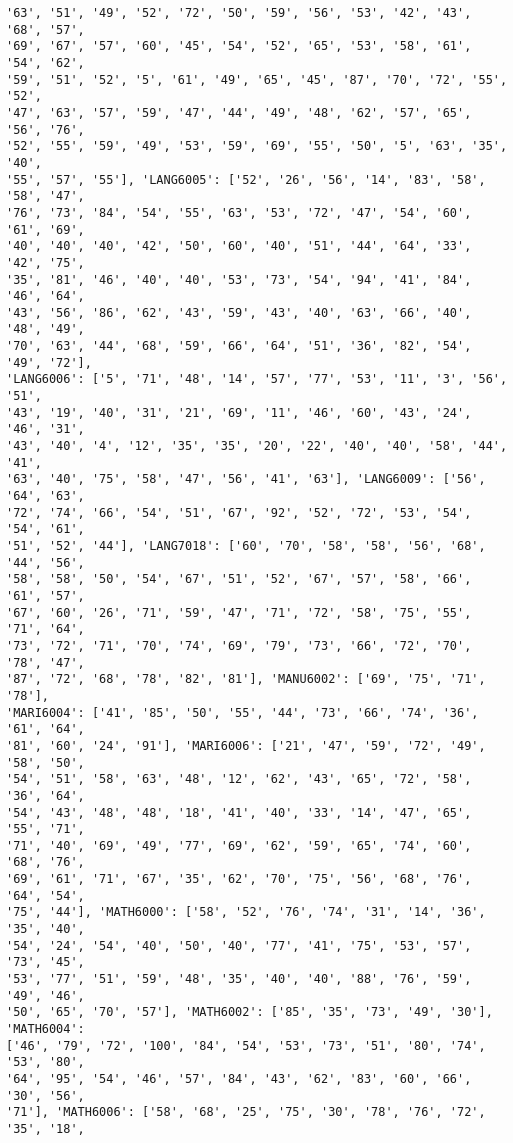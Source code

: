 \documentclass[11pt]{article}
\begin{document}
\begin{Verbatim}[commandchars=\\\{\}]
'63', '51', '49', '52', '72', '50', '59', '56', '53', '42', '43', '68', '57',
'69', '67', '57', '60', '45', '54', '52', '65', '53', '58', '61', '54', '62',
'59', '51', '52', '5', '61', '49', '65', '45', '87', '70', '72', '55', '52',
'47', '63', '57', '59', '47', '44', '49', '48', '62', '57', '65', '56', '76',
'52', '55', '59', '49', '53', '59', '69', '55', '50', '5', '63', '35', '40',
'55', '57', '55'], 'LANG6005': ['52', '26', '56', '14', '83', '58', '58', '47',
'76', '73', '84', '54', '55', '63', '53', '72', '47', '54', '60', '61', '69',
'40', '40', '40', '42', '50', '60', '40', '51', '44', '64', '33', '42', '75',
'35', '81', '46', '40', '40', '53', '73', '54', '94', '41', '84', '46', '64',
'43', '56', '86', '62', '43', '59', '43', '40', '63', '66', '40', '48', '49',
'70', '63', '44', '68', '59', '66', '64', '51', '36', '82', '54', '49', '72'],
'LANG6006': ['5', '71', '48', '14', '57', '77', '53', '11', '3', '56', '51',
'43', '19', '40', '31', '21', '69', '11', '46', '60', '43', '24', '46', '31',
'43', '40', '4', '12', '35', '35', '20', '22', '40', '40', '58', '44', '41',
'63', '40', '75', '58', '47', '56', '41', '63'], 'LANG6009': ['56', '64', '63',
'72', '74', '66', '54', '51', '67', '92', '52', '72', '53', '54', '54', '61',
'51', '52', '44'], 'LANG7018': ['60', '70', '58', '58', '56', '68', '44', '56',
'58', '58', '50', '54', '67', '51', '52', '67', '57', '58', '66', '61', '57',
'67', '60', '26', '71', '59', '47', '71', '72', '58', '75', '55', '71', '64',
'73', '72', '71', '70', '74', '69', '79', '73', '66', '72', '70', '78', '47',
'87', '72', '68', '78', '82', '81'], 'MANU6002': ['69', '75', '71', '78'],
'MARI6004': ['41', '85', '50', '55', '44', '73', '66', '74', '36', '61', '64',
'81', '60', '24', '91'], 'MARI6006': ['21', '47', '59', '72', '49', '58', '50',
'54', '51', '58', '63', '48', '12', '62', '43', '65', '72', '58', '36', '64',
'54', '43', '48', '48', '18', '41', '40', '33', '14', '47', '65', '55', '71',
'71', '40', '69', '49', '77', '69', '62', '59', '65', '74', '60', '68', '76',
'69', '61', '71', '67', '35', '62', '70', '75', '56', '68', '76', '64', '54',
'75', '44'], 'MATH6000': ['58', '52', '76', '74', '31', '14', '36', '35', '40',
'54', '24', '54', '40', '50', '40', '77', '41', '75', '53', '57', '73', '45',
'53', '77', '51', '59', '48', '35', '40', '40', '88', '76', '59', '49', '46',
'50', '65', '70', '57'], 'MATH6002': ['85', '35', '73', '49', '30'], 'MATH6004':
['46', '79', '72', '100', '84', '54', '53', '73', '51', '80', '74', '53', '80',
'64', '95', '54', '46', '57', '84', '43', '62', '83', '60', '66', '30', '56',
'71'], 'MATH6006': ['58', '68', '25', '75', '30', '78', '76', '72', '35', '18',

\end{Verbatim}
\end{document}
